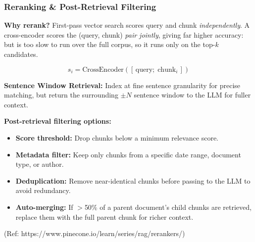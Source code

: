 \begin{frame}[fragile]\frametitle{Reranking \& Post-Retrieval Filtering}

\textbf{Why rerank?}
First-pass vector search scores query and chunk \textit{independently}. A cross-encoder scores the (query, chunk) \textit{pair jointly}, giving far higher accuracy: but is too slow to run over the full corpus, so it runs only on the top-$k$ candidates.

\[
  s_i = \text{CrossEncoder}([\,\text{query};\;\text{chunk}_i\,])
\]

\textbf{Sentence Window Retrieval:} Index at fine sentence granularity for precise matching, but return the surrounding $\pm N$ sentence window to the LLM for fuller context.

\vspace{0.3em}
\textbf{Post-retrieval filtering options:}
\begin{itemize}
  \item \textbf{Score threshold:} Drop chunks below a minimum relevance score.
  \item \textbf{Metadata filter:} Keep only chunks from a specific date range, document type, or author.
  \item \textbf{Deduplication:} Remove near-identical chunks before passing to the LLM to avoid redundancy.
  \item \textbf{Auto-merging:} If $>$50\% of a parent document's child chunks are retrieved, replace them with the full parent chunk for richer context.
\end{itemize}

{\tiny (Ref: https://www.pinecone.io/learn/series/rag/rerankers/)}

\end{frame}

